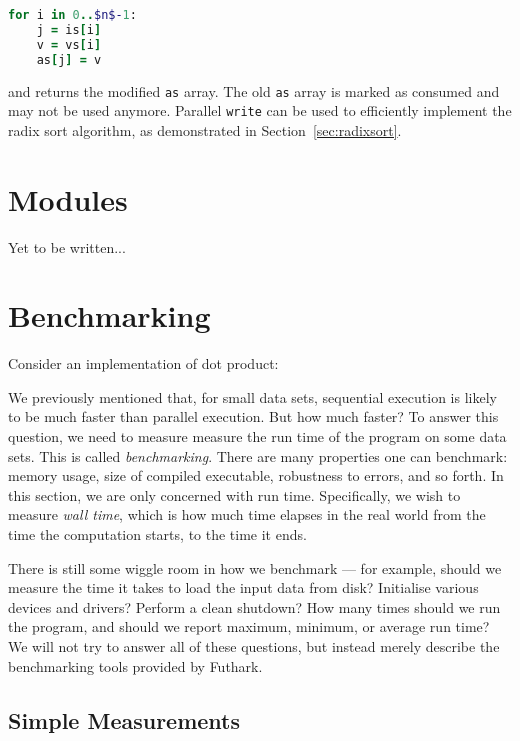\documentclass[oneside,11pt]{book}
\newenvironment{wrap}{\vspace{\topskip}\par\noindent\begin{minipage}{\linewidth}}{\end{minipage}\par}
\newcommand{\inplisting}[1]{\begin{wrap}\end{wrap}}
\begin{document}
\begin{lstlisting}[language=ruby,mathescape=true]
  for i in 0..$n$-1:
    j = is[i]
    v = vs[i]
    as[j] = v
\end{lstlisting}

\noindent
and returns the modified \texttt{as} array.  The old \texttt{as} array
is marked as consumed and may not be used anymore.  Parallel
\texttt{write} can be used to efficiently implement the radix sort algorithm, as demonstrated in Section~\ref{sec:radixsort}.

\section{Modules}
\label{sec:modules}

Yet to be written...

\section{Benchmarking}
\label{sec:benchmarking}

Consider an implementation of dot product:

\inplisting{src/dotprod.fut}

We previously mentioned that, for small data sets, sequential
execution is likely to be much faster than parallel execution.  But
how much faster?  To answer this question, we need to measure measure
the run time of the program on some data sets.  This is called
\textit{benchmarking}.  There are many properties one can benchmark:
memory usage, size of compiled executable, robustness to errors, and
so forth.  In this section, we are only concerned with run time.
Specifically, we wish to measure \textit{wall time}, which is how much
time elapses in the real world from the time the computation starts,
to the time it ends.

There is still some wiggle room in how we benchmark --- for example,
should we measure the time it takes to load the input data from disk?
Initialise various devices and drivers?  Perform a clean shutdown?
How many times should we run the program, and should we report
maximum, minimum, or average run time?  We will not try to answer all
of these questions, but instead merely describe the benchmarking tools
provided by Futhark.

\subsection{Simple Measurements}
\end{document}
